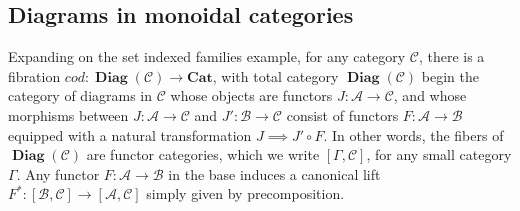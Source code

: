 \documentclass[a4paper,english]{lipics-v2018}
\DeclareMathOperator{\diag}{\mathbf{Diag}}
\begin{document}
\subsection{Diagrams in monoidal categories}
Expanding on the set indexed families example, for any category $\mathcal{C}$, there is a fibration $cod : \diag(\mathcal{C}) \to \mathbf{Cat}$, with total category $\diag(\mathcal{C})$ begin the category of diagrams in $\mathcal{C}$ whose objects are functors $J : \mathcal{A} \to \mathcal{C}$, and whose morphisms between $J : \mathcal{A} \to \mathcal{C}$ and $J' :\mathcal{B} \to \mathcal{C}$ consist of functors $F : \mathcal{A} \to \mathcal{B}$ equipped with a natural transformation $J \implies J' \circ F$. In other words, the fibers of $\diag(\mathcal{C})$ are functor categories, which we write $[\Gamma, \mathcal{C}]$, for any small category $\Gamma$. Any functor $F : \mathcal{A} \to \mathcal{B}$ in the base induces a canonical lift $F^* : [\mathcal{B}, \mathcal{C}] \to [\mathcal{A},\mathcal{C}]$ simply given by precomposition.
\end{document}
